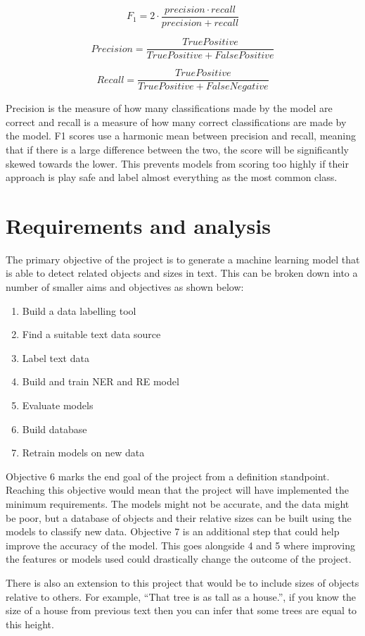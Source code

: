 \documentclass[11pt,oneside]{book}
\begin{document}
\[ F_1 = 2 \cdot \frac{precision \cdot recall}{precision + recall} \]

\[ Precision = \frac{True Positive}{True Positive + False Positive} \]

\[ Recall = \frac{True Positive}{True Positive + False Negative} \]

Precision is the measure of how many classifications made by the model are correct and recall is a measure of how many correct classifications are made by the model. F1 scores use a harmonic mean between precision and recall, meaning that if there is a large difference between the two, the score will be significantly skewed towards the lower. This prevents models from scoring too highly if their approach is play safe and label almost everything as the most common class.

\chapter{Requirements and analysis}

The primary objective of the project is to generate a machine learning model that is able to detect related objects and sizes in text. This can be broken down into a number of smaller aims and objectives as shown below:

\begin{enumerate}
\item Build a data labelling tool
\item Find a suitable text data source
\item Label text data
\item Build and train NER and RE model
\item Evaluate models
\item Build database
\item Retrain models on new data
\end{enumerate}

Objective 6 marks the end goal of the project from a definition standpoint. Reaching this objective would mean that the project will have implemented the minimum requirements. The models might not be accurate, and the data might be poor, but a database of objects and their relative sizes can be built using the models to classify new data. Objective 7 is an additional step that could help improve the accuracy of the model. This goes alongside 4 and 5 where improving the features or models used could drastically change the outcome of the project.

There is also an extension to this project that would be to include sizes of objects relative to others. For example, “That tree is as tall as a house.”, if you know the size of a house from previous text then you can infer that some trees are equal to this height.
\end{document}
